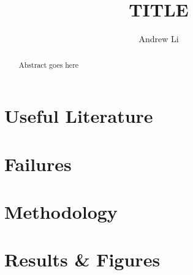 \documentclass[sigconf]{acmart}
\begin{document}
\title{TITLE}

\author{Andrew Li}

\begin{abstract}
  Abstract goes here
\end{abstract}


\maketitle

\section{Useful Literature}

\section{Failures}

\section{Methodology}

\section{Results \& Figures}
\end{document}
